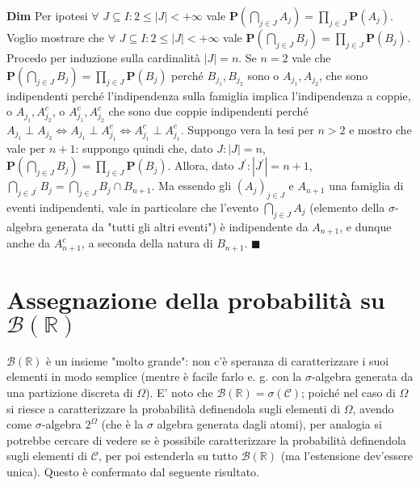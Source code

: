 \documentclass{article}
\begin{document}
\textbf{Dim} Per ipotesi $\forall $ $J\subseteq I:2\leq \left\vert
J\right\vert <+\infty $ vale $\mathbf{P}\left( \bigcap_{j\in J}A_{j}\right)
=\prod_{j\in J}\mathbf{P}\left( A_{j}\right) $. Voglio mostrare che $\forall 
$ $J\subseteq I:2\leq \left\vert J\right\vert <+\infty $ vale $\mathbf{P}%
\left( \bigcap_{j\in J}B_{j}\right) =\prod_{j\in J}\mathbf{P}\left(
B_{j}\right) $. Procedo per induzione sulla cardinalit\`{a} $\left\vert
J\right\vert =n$. Se $n=2$ vale che $\mathbf{P}\left( \bigcap_{j\in
J}B_{j}\right) =\prod_{j\in J}\mathbf{P}\left( B_{j}\right) $ perch\'{e} $%
B_{j_{1}},B_{j_{2}}$ sono o $A_{j_{1}},A_{j_{2}}$, che sono indipendenti
perch\'{e} l'indipendenza sulla famiglia implica l'indipendenza a coppie, o $%
A_{j_{1}},A_{j_{2}}^{c}$, o $A_{j_{1}}^{c},A_{j_{2}}^{c}$ che sono due
coppie indipendenti perch\'{e} $A_{j_{1}}\perp A_{j_{2}}\Longleftrightarrow
A_{j_{1}}\perp A_{j_{1}}^{c}\Longleftrightarrow A_{j_{1}}^{c}\perp
A_{j_{1}}^{c}$. Suppongo vera la tesi per $n>2$ e mostro che vale per $n+1$:
suppongo quindi che, dato $J:\left\vert J\right\vert =n$, $\mathbf{P}\left(
\bigcap_{j\in J}B_{j}\right) =\prod_{j\in J}\mathbf{P}\left( B_{j}\right) $.
Allora, dato $J^{\prime }:\left\vert J^{\prime }\right\vert =n+1$, $%
\bigcap_{j\in J^{\prime }}B_{j}=\bigcap_{j\in J}B_{j}\cap B_{n+1}$. Ma
essendo gli $\left( A_{j}\right) _{j\in J}$ e $A_{n+1}$ una famiglia di
eventi indipendenti, vale in particolare che l'evento $\bigcap_{j\in J}A_{j}$
(elemento della $\sigma $-algebra generata da "tutti gli altri eventi") \`{e}
indipendente da $A_{n+1}$, e dunque anche da $A_{n+1}^{c}$, a seconda della
natura di $B_{n+1}$. $\blacksquare $

\section{Assegnazione della probabilit\`{a} su $\mathcal{B}\left( 
\mathbb{R}
\right) $}

$\mathcal{B}\left( 
\mathbb{R}
\right) $ \`{e} un insieme "molto grande": non c'\`{e} speranza di
caratterizzare i suoi elementi in modo semplice (mentre \`{e} facile farlo
e. g. con la $\sigma $-algebra generata da una partizione discreta di $%
\Omega $). E' noto che $\mathcal{B}\left( 
\mathbb{R}
\right) =\sigma \left( \mathcal{C}\right) $; poich\'{e} nel caso di $\Omega $
si riesce a caratterizzare la probabilit\`{a} definendola sugli elementi di $%
\Omega $, avendo come $\sigma $-algebra $2^{\Omega }$ (che \`{e} la $\sigma $
algebra generata dagli atomi), per analogia si potrebbe cercare di vedere se 
\`{e} possibile caratterizzare la probabilit\`{a} definendola sugli elementi
di $\mathcal{C}$, per poi estenderla su tutto $\mathcal{B}\left( 
\mathbb{R}
\right) $ (ma l'estensione dev'essere unica). Questo \`{e} confermato dal
seguente risultato.
\end{document}
